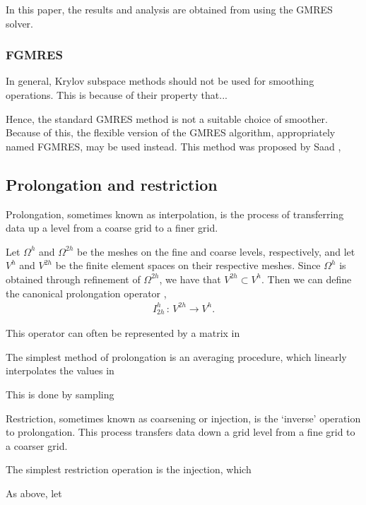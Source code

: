 In this paper, the results and analysis are obtained from using the GMRES solver.


\subsubsection{FGMRES}

In general, Krylov subspace methods should not be used for smoothing operations.
This is because of their property that...

Hence, the standard GMRES method is not a suitable choice of smoother.
Because of this, the flexible version of the GMRES algorithm, appropriately named FGMRES, may be used instead.
This method was proposed by Saad \cite{fgmres}, 





\subsection{Prolongation and restriction}

Prolongation, sometimes known as interpolation, is the process of transferring data up a level from a coarse grid to a finer grid.

Let $\Omega^h$ and $\Omega^{2h}$ be the meshes on the fine and coarse levels, respectively, and let $V^{h}$ and $V^{2h}$ be the finite element spaces on their respective meshes.
Since $\Omega^{h}$ is obtained through refinement of $\Omega^{2h}$, we have that $V^{2h}\subset V^h$.
Then we can define the canonical prolongation operator \cite{volker},
\begin{align}
	I^h_{2h} \, : \, V^{2h} \rightarrow V^h.
\end{align}


This operator can often be represented by a matrix in 

The simplest method of prolongation is an averaging procedure, which linearly interpolates the values in

This is done by sampling




Restriction, sometimes known as coarsening or injection, is the `inverse' operation to prolongation.
This process transfers data down a grid level from a fine grid to a coarser grid.

The simplest restriction operation is the injection, which 


As above, let 


